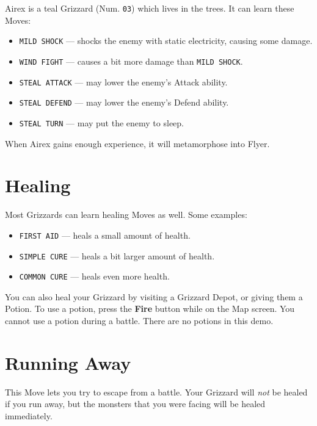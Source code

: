 \documentclass[10pt,twocolumn,openany,article]{memoir}
\newenvironment{ritemize}{\begin{itemize}\raggedright}{\end{itemize}}
\begin{document}
Airex is  a teal Grizzard (Num.  \texttt{03}) which lives in  the trees.
It can learn these Moves:

\begin{ritemize}
\item \texttt{MILD SHOCK} --- shocks  the enemy with static electricity,
  causing some damage.
\item \texttt{WIND FIGHT} --- causes a bit more damage than \texttt{MILD SHOCK}.
\item \texttt{STEAL ATTACK} --- may lower the enemy's Attack ability.
\item \texttt{STEAL DEFEND} --- may lower the enemy's Defend ability.
\item \texttt{STEAL TURN} --- may put the enemy to sleep.
\end{ritemize}

When Airex gains enough experience, it will metamorphose into Flyer.

\fi

\pagebreak

\section{Healing}

Most Grizzards can learn healing Moves as well. Some examples:

\begin{ritemize}
\item \texttt{FIRST AID} --- heals a small amount of health.
\item \texttt{SIMPLE CURE} --- heals a bit larger amount of health.
\item \texttt{COMMON CURE} --- heals even more health.
\end{ritemize}

You can also heal your Grizzard  by visiting a Grizzard Depot, or giving
them a Potion. To use a  potion, press the \textbf{Fire} button while on
the Map screen. You cannot use a potion during a battle. \ifdefined\DEMO
There are no potions in this demo. \fi

\section{Running Away}

This  Move lets  you try  to escape  from a  battle. Your  Grizzard will
\emph{not} be  healed if you  run away, but  the monsters that  you were
facing will be healed immediately.
\end{document}
